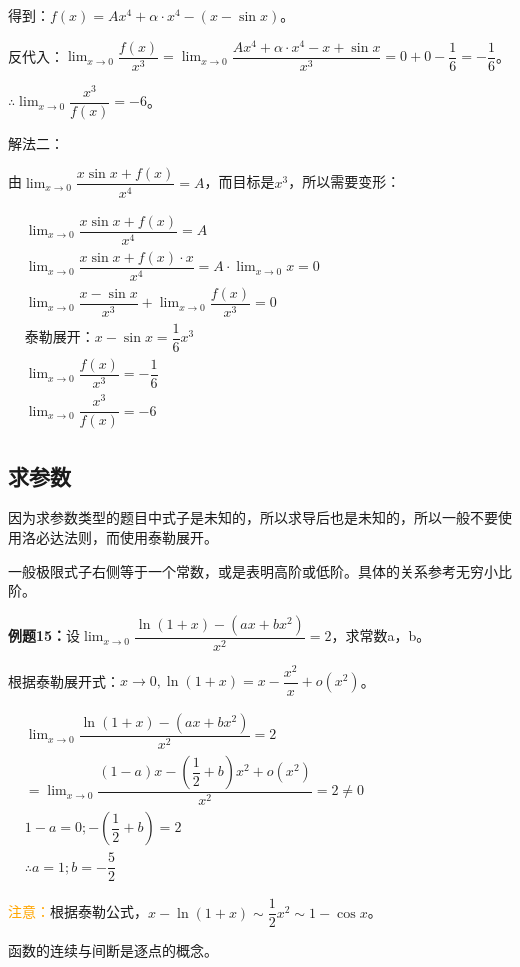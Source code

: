 \documentclass[UTF8]{ctexart}
\begin{document}
得到：$f(x)=Ax^4+\alpha\cdot x^4-(x-\sin x)$。

反代入：$\lim_{x\to 0}\dfrac{f(x)}{x^3}=\lim_{x\to 0}\dfrac{Ax^4+\alpha\cdot x^4-x+\sin x}{x^3}=0+0-\dfrac{1}{6}=-\dfrac{1}{6}$。

$\therefore \lim_{x\to 0}\dfrac{x^3}{f(x)}=-6$。

解法二：

由$\lim_{x\to 0}\dfrac{x\sin x+f(x)}{x^4}=A$，而目标是$x^3$，所以需要变形：

$
\begin{aligned}
    & \lim_{x\to 0}\dfrac{x\sin x+f(x)}{x^4}=A \\
    & \lim_{x\to 0}\dfrac{x\sin x+f(x)\cdot x}{x^4}=A\cdot\lim_{x\to 0}x=0 \\
    & \lim_{x\to 0}\dfrac{x-\sin x}{x^3}+\lim_{x\to 0}\dfrac{f(x)}{x^3}=0 \\
    & \text{泰勒展开：}x-\sin x=\dfrac{1}{6}x^3 \\
    & \lim_{x\to 0}\dfrac{f(x)}{x^3}=-\dfrac{1}{6} \\
    & \lim_{x\to 0}\dfrac{x^3}{f(x)}=-6
\end{aligned}
$

\subsection{求参数}

因为求参数类型的题目中式子是未知的，所以求导后也是未知的，所以一般不要使用洛必达法则，而使用泰勒展开。

一般极限式子右侧等于一个常数，或是表明高阶或低阶。具体的关系参考无穷小比阶。

\textbf{例题15：}设$\lim_{x\to 0}\dfrac{\ln(1+x)-(ax+bx^2)}{x^2}=2$，求常数a，b。

根据泰勒展开式：$x\to 0,\ln(1+x)=x-\dfrac{x^2}{x}+o(x^2)$。

$
\begin{aligned}
    & \lim_{x\to 0}\dfrac{\ln(1+x)-(ax+bx^2)}{x^2}=2 \\
    & =\lim_{x\to 0}\dfrac{(1-a)x-\left(\dfrac{1}{2}+b\right)x^2+o(x^2)}{x^2}=2\neq 0 \\
    & 1-a=0;-\left(\dfrac{1}{2}+b\right)=2 \\
    & \therefore a=1;b=-\dfrac{5}{2}
\end{aligned}
$

\textcolor{orange}{注意：}根据泰勒公式，$x-\ln(1+x)\sim\dfrac{1}{2}x^2\sim 1-\cos x$。

函数的连续与间断是逐点的概念。
\end{document}
